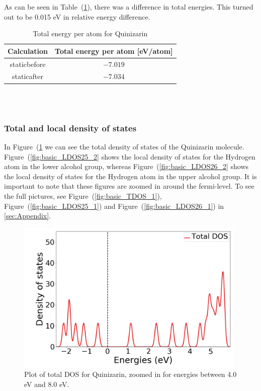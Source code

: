 \documentclass{article}
\begin{document}
      As can be seen in Table~(\ref{tab:TOTENquinizarin}), there was a difference in total energies. This turned out to be 0.015 eV in relative energy difference.

      \begin{table}[H]
        \centering
        \caption{Total energy per atom for Quinizarin}
        \label{tab:TOTENquinizarin}
        \begin{tabular}{|c|c|}
            \hline
            Calculation & Total energy per atom [eV/atom]  \\
            \hline \hline
            staticbefore & $-7.019$ \\
            staticafter & $-7.034$ \\
            \hline
        \end{tabular} \\
        \hspace{0pt}\\
    \end{table}

    \subsubsection{Total and local density of states}

      In Figure~(\ref{fig:basic_TDOS_2} we can see the total density of states of the Quinizarin molecule. Figure~(\ref{fig:basic_LDOS25_2} shows the local density of states for the Hydrogen atom in the lower alcohol group, whereas Figure~(\ref{fig:basic_LDOS26_2} shows the local density of states for the Hydrogen atom in the upper alcohol group.
      It is important to note that these figures are zoomed in around the fermi-level. To see the full pictures, see Figure~(\ref{fig:basic_TDOS_1}), Figure~(\ref{fig:basic_LDOS25_1}) and Figure~(\ref{fig:basic_LDOS26_1}) in \ref{sec:Appendix}. \\


      \begin{figure}[H]
        \centering
        \includegraphics[width = 11cm]{../fig/basic_TDOS_2.png}
        \caption{Plot of total DOS for Quinizarin, zoomed in for energies between 4.0 eV and 8.0 eV. }
        \label{fig:basic_TDOS_2}
      \end{figure}
\end{document}
